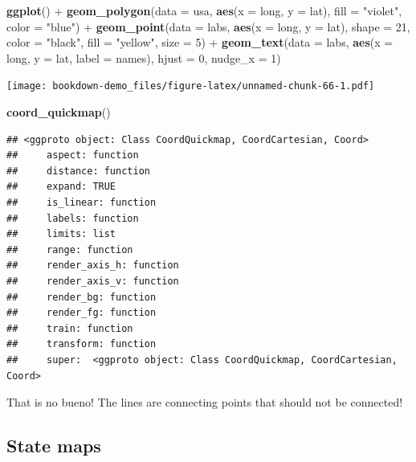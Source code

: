 \documentclass[]{book}
\newenvironment{Shaded}{\begin{snugshade}}{\end{snugshade}}
\newcommand{\KeywordTok}[1]{\textcolor[rgb]{0.13,0.29,0.53}{\textbf{{#1}}}}
\newcommand{\DataTypeTok}[1]{\textcolor[rgb]{0.13,0.29,0.53}{{#1}}}
\newcommand{\DecValTok}[1]{\textcolor[rgb]{0.00,0.00,0.81}{{#1}}}
\newcommand{\StringTok}[1]{\textcolor[rgb]{0.31,0.60,0.02}{{#1}}}
\newcommand{\NormalTok}[1]{{#1}}
\theoremstyle{definition}
\theoremstyle{definition}
\theoremstyle{remark}
\begin{document}
\begin{Shaded}
\begin{Highlighting}[]
\KeywordTok{ggplot}\NormalTok{() +}\StringTok{ }
\StringTok{      }\KeywordTok{geom_polygon}\NormalTok{(}\DataTypeTok{data =} \NormalTok{usa, }\KeywordTok{aes}\NormalTok{(}\DataTypeTok{x =} \NormalTok{long, }\DataTypeTok{y =} \NormalTok{lat), }\DataTypeTok{fill =} \StringTok{"violet"}\NormalTok{, }\DataTypeTok{color =} \StringTok{"blue"}\NormalTok{) +}\StringTok{ }
\StringTok{      }\KeywordTok{geom_point}\NormalTok{(}\DataTypeTok{data =} \NormalTok{labs, }\KeywordTok{aes}\NormalTok{(}\DataTypeTok{x =} \NormalTok{long, }\DataTypeTok{y =} \NormalTok{lat), }\DataTypeTok{shape =} \DecValTok{21}\NormalTok{, }\DataTypeTok{color =} \StringTok{"black"}\NormalTok{, }\DataTypeTok{fill =} \StringTok{"yellow"}\NormalTok{, }\DataTypeTok{size =} \DecValTok{5}\NormalTok{) +}
\StringTok{      }\KeywordTok{geom_text}\NormalTok{(}\DataTypeTok{data =} \NormalTok{labs, }\KeywordTok{aes}\NormalTok{(}\DataTypeTok{x =} \NormalTok{long, }\DataTypeTok{y =} \NormalTok{lat, }\DataTypeTok{label =} \NormalTok{names), }\DataTypeTok{hjust =} \DecValTok{0}\NormalTok{, }\DataTypeTok{nudge_x =} \DecValTok{1}\NormalTok{)}
\end{Highlighting}
\end{Shaded}

\texttt{[image: bookdown-demo\_files/figure-latex/unnamed-chunk-66-1.pdf]}

\begin{Shaded}
\begin{Highlighting}[]
      \KeywordTok{coord_quickmap}\NormalTok{()}
\end{Highlighting}
\end{Shaded}

\begin{verbatim}
## <ggproto object: Class CoordQuickmap, CoordCartesian, Coord>
##     aspect: function
##     distance: function
##     expand: TRUE
##     is_linear: function
##     labels: function
##     limits: list
##     range: function
##     render_axis_h: function
##     render_axis_v: function
##     render_bg: function
##     render_fg: function
##     train: function
##     transform: function
##     super:  <ggproto object: Class CoordQuickmap, CoordCartesian, Coord>
\end{verbatim}

That is no bueno! The lines are connecting points that should not be
connected!

\subsection{State maps}\label{state-maps}
\end{document}
